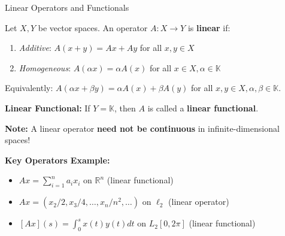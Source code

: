 \documentclass[aspectratio=169,10pt]{beamer}
\begin{document}
\begin{frame}{Linear Operators and Functionals}
  \begin{definition}
    Let $X, Y$ be vector spaces. An operator $A : X \to Y$ is \textbf{linear} if:
    \begin{enumerate}
      \item \textit{Additive}: $A(x + y) = Ax + Ay$ for all $x, y \in X$
      \item \textit{Homogeneous}: $A(\alpha x) = \alpha A(x)$ for all $x \in X, \alpha \in \mathbb{K}$
    \end{enumerate}
    Equivalently: $A(\alpha x + \beta y) = \alpha A(x) + \beta A(y)$ for all $x, y \in X, \alpha, \beta \in \mathbb{K}$.
  \end{definition}

  \vspace{0.3cm}
  \textbf{Linear Functional:} If $Y = \mathbb{K}$, then $A$ is called a \textbf{linear functional}.

  \vspace{0.3cm}
  \textbf{Note:} A linear operator \textbf{need not be continuous} in infinite-dimensional spaces!

  \vspace{0.3cm}
  \textbf{Key Operators Example:}
  \begin{itemize}
    \item $Ax = \sum_{i=1}^{n} a_i x_i$ on $\mathbb{R}^n$ (linear functional)
    \item $Ax = (x_2/2, x_3/4, \ldots, x_n/n^2, \ldots)$ on $\ell_2$ (linear operator)
    \item $[Ax](s) = \int_0^s x(t)y(t) dt$ on $L_2[0, 2\pi]$ (linear functional)
  \end{itemize}
\end{frame}
\end{document}
